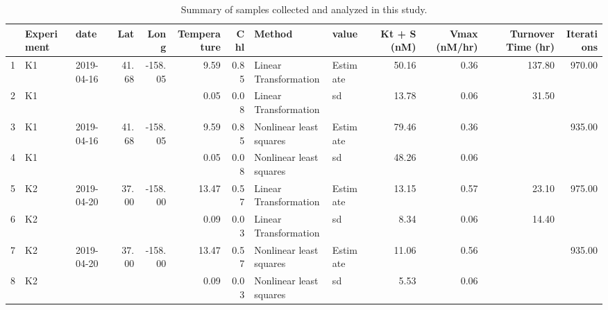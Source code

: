 \begin{table}[ht]
\centering
\begin{tabular}{rllrrrrllrrrr}
  \hline
 & Experiment & date & Lat & Long & Temperature & Chl & Method & value & Kt + S (nM) & Vmax (nM/hr) & Turnover Time (hr) & Iterations \\ 
  \hline
1 & K1 & 2019-04-16 & 41.68 & -158.05 & 9.59 & 0.85 & Linear Transformation & Estimate & 50.16 & 0.36 & 137.80 & 970.00 \\ 
  2 & K1 &  &  &  & 0.05 & 0.08 & Linear Transformation & sd & 13.78 & 0.06 & 31.50 &  \\ 
  3 & K1 & 2019-04-16 & 41.68 & -158.05 & 9.59 & 0.85 & Nonlinear least squares & Estimate & 79.46 & 0.36 &  & 935.00 \\ 
  4 & K1 &  &  &  & 0.05 & 0.08 & Nonlinear least squares & sd & 48.26 & 0.06 &  &  \\ 
  5 & K2 & 2019-04-20 & 37.00 & -158.00 & 13.47 & 0.57 & Linear Transformation & Estimate & 13.15 & 0.57 & 23.10 & 975.00 \\ 
  6 & K2 &  &  &  & 0.09 & 0.03 & Linear Transformation & sd & 8.34 & 0.06 & 14.40 &  \\ 
  7 & K2 & 2019-04-20 & 37.00 & -158.00 & 13.47 & 0.57 & Nonlinear least squares & Estimate & 11.06 & 0.56 &  & 935.00 \\ 
  8 & K2 &  &  &  & 0.09 & 0.03 & Nonlinear least squares & sd & 5.53 & 0.06 &  &  \\ 
   \hline
\end{tabular}
\caption{Summary of samples collected and analyzed in this study.} 
\label{siteSummary}
\end{table}
